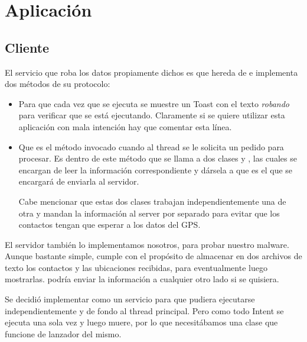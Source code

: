 \section{Aplicación}

\subsection{Cliente}

El servicio que roba los datos propiamente dichos es  que hereda de  e implementa dos m\'etodos de su protocolo: 

\begin{itemize}
 \item {} 
 
 Para que cada vez que se ejecuta se muestre un Toast con el texto {\it robando} para verificar que se est\'a ejecutando. Claramente si se quiere utilizar esta aplicaci\'on con mala intenci\'on hay que comentar esta l\'inea. 
 
 \item {}
 
 Que es el m\'etodo invocado cuando al thread se le solicita un pedido para procesar. Es dentro de este m\'etodo que se llama a dos clases  y , las cuales se encargan de leer la informaci\'on correspondiente y d\'arsela a  que es el que se encargar\'a de enviarla al servidor. 
 
 Cabe mencionar que estas dos clases trabajan independientemente una de otra y mandan la informaci\'on al server por separado para evitar que los contactos tengan que esperar a los datos del GPS. 
 
\end{itemize}

El servidor tambi\'en lo implementamos nosotros, para probar nuestro malware. Aunque bastante simple, cumple con el prop\'osito de almacenar en dos archivos de texto los contactos y las ubicaciones recibidas, para eventualmente luego mostrarlas.  podr\'ia enviar la informaci\'on a cualquier otro lado si se quisiera. 

Se decidi\'o implementar  como un servicio para que pudiera ejecutarse independientemente y de fondo al thread principal. Pero como todo Intent se ejecuta una sola vez y luego muere, por lo que necesit\'abamos una clase que funcione de lanzador del mismo. 

